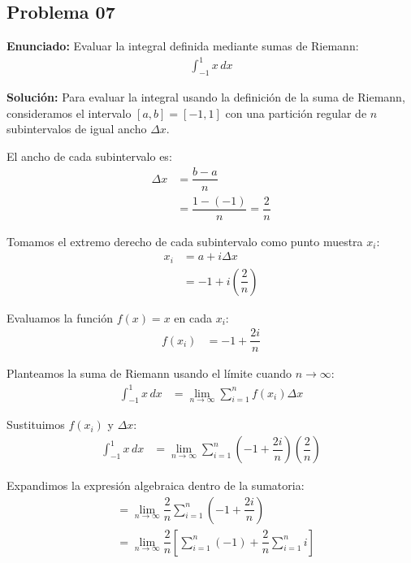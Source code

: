 \subsection*{Problema 07}

\textbf{Enunciado:} Evaluar la integral definida 
mediante sumas de Riemann:
\begin{align*}
\int_{-1}^{1} x \, dx
\end{align*}

\textbf{Solución:} 
Para evaluar la integral usando la definición 
de la suma de Riemann, consideramos el intervalo 
$[a, b] = [-1, 1]$ con una partición regular 
de $n$ subintervalos de igual ancho $\Delta x$.

El ancho de cada subintervalo es:
\begin{align*}
\Delta x &= \dfrac{b - a}{n} \\
&= \dfrac{1 - (-1)}{n} = \dfrac{2}{n}
\end{align*}

Tomamos el extremo derecho de cada subintervalo 
como punto muestra $x_i$:
\begin{align*}
x_i &= a + i \Delta x \\
&= -1 + i \left(\dfrac{2}{n}\right)
\end{align*}

Evaluamos la función $f(x) = x$ en cada $x_i$:
\begin{align*}
f(x_i) &= -1 + \dfrac{2i}{n}
\end{align*}

Planteamos la suma de Riemann usando el 
límite cuando $n \to \infty$:
\begin{align*}
\int_{-1}^{1} x \, dx &= \lim_{n \to \infty} 
\sum_{i=1}^{n} f(x_i) \Delta x
\end{align*}

Sustituimos $f(x_i)$ y $\Delta x$:
\begin{align*}
\int_{-1}^{1} x \, dx &= \lim_{n \to \infty} 
\sum_{i=1}^{n} \left( -1 + \dfrac{2i}{n} \right) 
\left( \dfrac{2}{n} \right)
\end{align*}

Expandimos la expresión algebraica dentro 
de la sumatoria:
\begin{align*}
&= \lim_{n \to \infty} \dfrac{2}{n} \sum_{i=1}^{n} 
\left( -1 + \dfrac{2i}{n} \right) \\
&= \lim_{n \to \infty} \dfrac{2}{n} \left[ 
\sum_{i=1}^{n} (-1) + \dfrac{2}{n} \sum_{i=1}^{n} i 
\right]
\end{align*}

